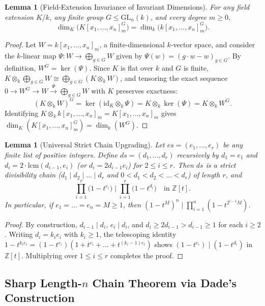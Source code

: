 \documentclass[11pt]{article}
\newtheorem{lemma}[theorem]{Lemma}
\theoremstyle{definition}
\theoremstyle{remark}
\begin{document}
\begin{lemma}[Field-Extension Invariance of Invariant Dimensions]
\label{lem:basechange}
For any field extension $K / k$, any finite group $G \le \mathrm{GL}_n(k)$, and every degree $m \ge 0$,
\[
\dim_K\bigl(K[x_1,\dots,x_n]_m^G\bigr) = \dim_k\bigl(k[x_1,\dots,x_n]_m^G\bigr).
\]
\end{lemma}

\begin{proof}
Let $W = k[x_1,\dots,x_n]_m$, a finite-dimensional $k$-vector space, and consider the $k$-linear map $\Psi : W \to \bigoplus_{g \in G} W$ given by $\Psi(w) = (g \cdot w - w)_{g \in G}$. By definition, $W^G = \ker(\Psi)$. Since $K$ is flat over $k$ and $G$ is finite, $K \otimes_k \bigoplus_{g \in G} W \cong \bigoplus_{g \in G} (K \otimes_k W)$, and tensoring the exact sequence $0 \to W^G \to W \xrightarrow{\Psi} \bigoplus_{g \in G} W$ with $K$ preserves exactness:
\[
(K \otimes_k W)^G = \ker(\mathrm{id}_K \otimes_k \Psi) = K \otimes_k \ker(\Psi) = K \otimes_k W^G.
\]
Identifying $K \otimes_k k[x_1,\dots,x_n]_m = K[x_1,\dots,x_n]_m$ gives $\dim_K(K[x_1,\dots,x_n]_m^G) = \dim_k(W^G)$.
\end{proof}

\begin{lemma}[Universal Strict Chain Upgrading]
\label{lem:upgrade}
Let $es = (e_1,\dots,e_r)$ be any finite list of positive integers. Define $ds = (d_1,\dots,d_r)$ recursively by $d_1 = e_1$ and $d_i = 2 \cdot \mathrm{lcm}(d_{i-1}, e_i)$ (or $d_i = 2 d_{i-1} e_i$) for $2 \le i \le r$. Then $ds$ is a strict divisibility chain ($d_1 \mid d_2 \mid \dots \mid d_r$ and $0 < d_1 < d_2 < \dots < d_r$) of length $r$, and
\[
\prod_{i=1}^{r} \bigl(1 - t^{e_i}\bigr) \;\Bigg|\; \prod_{i=1}^{r} \bigl(1 - t^{d_i}\bigr) \quad \text{in } \mathbb{Z}[t].
\]
In particular, if $e_1 = \dots = e_n = M \ge 1$, then $(1 - t^M)^n \mid \prod_{i=1}^{n} (1 - t^{2^{i-1} M})$.
\end{lemma}

\begin{proof}
By construction, $d_{i-1} \mid d_i$, $e_i \mid d_i$, and $d_i \ge 2 d_{i-1} > d_{i-1} \ge 1$ for each $i \ge 2$. Writing $d_i = k_i e_i$ with $k_i \ge 1$, the telescoping identity $1 - t^{k_i e_i} = (1 - t^{e_i})(1 + t^{e_i} + \dots + t^{(k_i-1)e_i})$ shows $(1 - t^{e_i}) \mid (1 - t^{d_i})$ in $\mathbb{Z}[t]$. Multiplying over $1 \le i \le r$ completes the proof.
\end{proof}

\subsection{Sharp Length-\texorpdfstring{$n$}{n} Chain Theorem via Dade's Construction}
\end{document}
